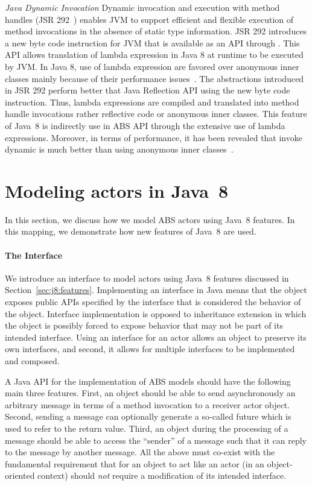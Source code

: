 \textsl{Java Dynamic Invocation}
Dynamic invocation and execution with method handles (JSR 292~\cite{jsr292:invokedyn}) enables JVM to support efficient and flexible execution of method invocations in the absence of static type information. 
JSR 292 introduces a new byte code instruction  for JVM that is available as an API through .
This API allows translation of lambda expression in Java 8 at runtime to be executed by JVM.
In Java 8, use of lambda expression are favored over anonymous inner classes mainly because of their performance issues~\cite{lambda:perf}.
The abstractions introduced in JSR 292 perform better that Java Reflection API using the new byte code instruction. 
Thus, lambda expressions are compiled and translated into method handle invocations rather reflective code or anonymous inner classes.
This feature of Java~8 is indirectly use in ABS API through the extensive use of lambda expressions.
Moreover, in terms of performance, it has been revealed that invoke dynamic is much better than using anonymous inner classes~\cite{lambda:perf}.

\section{Modeling actors in Java~8}
\label{sec:j8:actors:realization}

In this section, we discuss how we model ABS actors  using Java~8 features.
In this mapping, we demonstrate how new features of Java~8 are used.

\paragraph{The  Interface}
We introduce an interface to model actors  using Java~8 features discussed in Section~\ref{sec:j8:features}.
Implementing an interface in Java means that the object exposes public APIs specified by the interface that is considered the behavior of the object.
Interface implementation is opposed to inheritance extension in which the object is 
possibly forced to expose behavior that may not be part of its intended interface.  
Using an interface for an actor  allows an object to preserve its own interfaces, and second, 
it allows for multiple interfaces to be implemented and composed.

A Java API for the implementation of ABS models should have the following main three  features.
First, an object should be able to send asynchronously an arbitrary message in terms of a method invocation to a receiver actor object.
Second, sending a message can optionally generate a so-called future which is used to refer to the return value.
Third, an object during the processing of a message should be able to access the ``sender'' of a message such that it can reply to the message by another message.
All the above must co-exist with the 
fundamental requirement that for an object to act like an actor (in an object-oriented context)
should \emph{not} require a modification of its intended interface.


